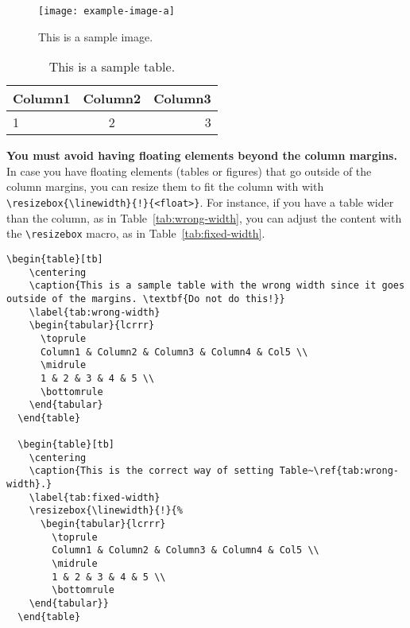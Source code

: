 \documentclass[abstract]{nldl}
\begin{document}
\begin{enumerate}[leftmargin=*]
\begin{figure}[tb]
  \centering
  \texttt{[image: example-image-a]}
  \caption{This is a sample image.}
  \label{fig:sample}
\end{figure}

\begin{table}[tb]
  \centering
  \caption{This is a sample table.}
  \label{tab:sample}
  \begin{tabular}{lcr}
    \toprule
    Column1 & Column2 & Column3 \\
    \midrule
    1 & 2 & 3 \\
    \bottomrule
  \end{tabular}
\end{table}

\textbf{You must avoid having floating elements beyond the column margins.}
In case you have floating elements (tables or figures) that go outside of the column margins, you can resize them to fit the column with with \verb|\resizebox{\linewidth}{!}{<float>}|.
For instance, if you have a table wider than the column, as in Table~\ref{tab:wrong-width}, you can adjust the content with the \verb|\resizebox| macro, as in Table~\ref{tab:fixed-width}.
\begin{lstlisting}[gobble=2]
  \begin{table}[tb]
    \centering
    \caption{This is a sample table with the wrong width since it goes outside of the margins. \textbf{Do not do this!}}
    \label{tab:wrong-width}
    \begin{tabular}{lcrrr}
      \toprule
      Column1 & Column2 & Column3 & Column4 & Col5 \\
      \midrule
      1 & 2 & 3 & 4 & 5 \\
      \bottomrule
    \end{tabular}
  \end{table}

  \begin{table}[tb]
    \centering
    \caption{This is the correct way of setting Table~\ref{tab:wrong-width}.}
    \label{tab:fixed-width}
    \resizebox{\linewidth}{!}{%
      \begin{tabular}{lcrrr}
        \toprule
        Column1 & Column2 & Column3 & Column4 & Col5 \\
        \midrule
        1 & 2 & 3 & 4 & 5 \\
        \bottomrule
    \end{tabular}}
  \end{table}
\end{lstlisting}


\end{enumerate}
\end{document}
